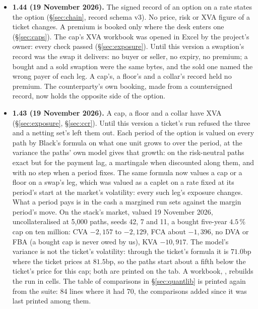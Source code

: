 \documentclass[11pt,a4paper]{article}
\newcommand{\code}[1]{\ifmmode\text{\small\texttt{\detokenize{#1}}}\else{\small\path{#1}}\fi}
\begin{document}
{\begin{itemize}[leftmargin=1.4em, itemsep=4pt]
\item \textbf{1.44 (19 November 2026).} The signed record of an option on a rate states the option (\S\ref{sec:chain}, record schema v3). No price, risk or XVA figure of a ticket changes. A premium is booked only where the desk enters one (\S\ref{sec:caps}). The cap's XVA workbook was opened in Excel by the project's owner: every check passed (\S\ref{sec:exposure}). Until this version a swaption's record was the swap it delivers: no buyer or seller, no expiry, no premium; a bought and a sold swaption were the same bytes, and the sold one named the wrong payer of each leg. A cap's, a floor's and a collar's record held no premium. The counterparty's own booking, made from a countersigned record, now holds the opposite side of the option.
\item \textbf{1.43 (19 November 2026).} A cap, a floor and a collar have XVA (\S\ref{sec:exposure}, \S\ref{sec:ccr}). Until this version a ticket's run refused the three and a netting set's left them out. Each period of the option is valued on every path by Black's formula on what one unit grows to over the period, at the variance the paths' own model gives that growth: on the risk-neutral paths exact but for the payment lag, a martingale when discounted along them, and with no step when a period fixes. The same formula now values a cap or a floor on a swap's leg, which was valued as a caplet on a rate fixed at its period's start at the market's volatility: every such leg's exposure changes. What a period pays is in the cash a margined run sets against the margin period's move. On the stack's market, valued 19 November 2026, uncollateralised at 5{,}000 paths, seeds 42, 7 and 11, a bought five-year $4.5\,\%$ cap on ten million: CVA $-2{,}157$ to $-2{,}129$, FCA about $-1{,}396$, no DVA or FBA (a bought cap is never owed by us), KVA $-10{,}917$. The model's variance is not the ticket's volatility: through the ticket's formula it is $71.0$bp where the ticket prices at $81.5$bp, so the paths start about a fifth below the ticket's price for this cap; both are printed on the tab. A workbook, \code{xva\_cap}, rebuilds the run in cells. The table of comparisons in \S\ref{sec:quantlib} is printed again from the suite: 84 lines where it had 70, the comparisons added since it was last printed among them.

\end{itemize}}
\end{document}
